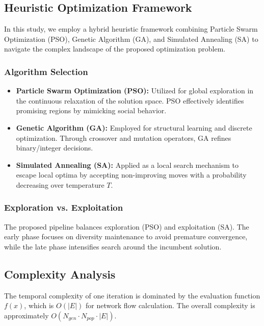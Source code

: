 \subsection{Heuristic Optimization Framework}
In this study, we employ a hybrid heuristic framework combining Particle Swarm Optimization (PSO), Genetic Algorithm (GA), and Simulated Annealing (SA) to navigate the complex landscape of the proposed optimization problem.

\subsubsection{Algorithm Selection}
\begin{itemize}
    \item \textbf{Particle Swarm Optimization (PSO):} Utilized for global exploration in the continuous relaxation of the solution space. PSO effectively identifies promising regions by mimicking social behavior.
    \item \textbf{Genetic Algorithm (GA):} Employed for structural learning and discrete optimization. Through crossover and mutation operators, GA refines binary/integer decisions.
    \item \textbf{Simulated Annealing (SA):} Applied as a local search mechanism to escape local optima by accepting non-improving moves with a probability decreasing over temperature $T$.
\end{itemize}

\subsubsection{Exploration vs. Exploitation}
The proposed pipeline balances exploration (PSO) and exploitation (SA). The early phase focuses on diversity maintenance to avoid premature convergence, while the late phase intensifies search around the incumbent solution.

\subsection{Complexity Analysis}
The temporal complexity of one iteration is dominated by the evaluation function $f(x)$, which is $O(|E|)$ for network flow calculation. The overall complexity is approximately $O(N_{gen} \cdot N_{pop} \cdot |E|)$.
